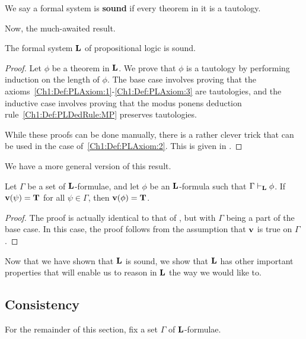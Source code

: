 \begin{boxdefinition}[Soundness]
    We say a formal system is \textbf{sound} if every theorem in it is a tautology.
\end{boxdefinition}

Now, the much-awaited result.

\begin{boxtheorem}[Soundness of $\bL$]\label{Ch1:Thm:LSoundness}
    The formal system $\bL$ of propositional logic is sound.
\end{boxtheorem}
\begin{proof}
    Let $\phi$ be a theorem in $\bL$. We prove that $\phi$ is a tautology by performing induction on the length of $\phi$. The base case involves proving that the axioms~\ref{Ch1:Def:PLAxiom:1}-\ref{Ch1:Def:PLAxiom:3} are tautologies, and the inductive case involves proving that the modus ponens deduction rule~\ref{Ch1:Def:PLDedRule:MP} preserves tautologies.

    While these proofs can be done manually, there is a rather clever trick that can be used in the case of~\ref{Ch1:Def:PLAxiom:2}. This is given in \cite[Proof of 1.3.1]{LecNotes2018}. \sorry %
\end{proof}

We have a more general version of this result.

\begin{boxtheorem}
    Let $\Gamma$ be a set of $\bL$-formulae, and let $\phi$ be an $\bL$-formula such that $\Gamma \vdash_{\mathbf{L}} \phi$. If $\mathbf{v}\!\left( \psi \right) = \mathbf{T}$ for all $\psi \in \Gamma$, then $\mathbf{v}\!\left( \phi \right) = \mathbf{T}$.
\end{boxtheorem}
\begin{proof}
    The proof is actually identical to that of , but with $\Gamma$ being a part of the base case. In this case, the proof follows from the assumption that $\mathbf{v}$ is true on $\Gamma$.
\end{proof}

Now that we have shown that $\bL$ is sound, we show that $\bL$ has other important properties that will enable us to reason in $\bL$ the way we would like to.

\subsection{Consistency}

For the remainder of this section, fix a set $\Gamma$ of $\bL$-formulae.

